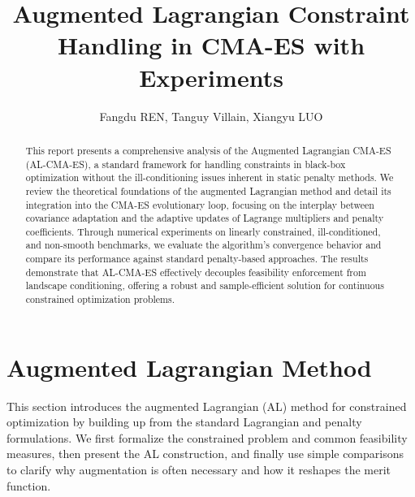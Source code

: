 \documentclass[11pt,a4paper]{article}
\title{Augmented Lagrangian Constraint Handling in CMA-ES with Experiments}
\author{Fangdu REN, Tanguy Villain, Xiangyu LUO}
\date{}
\numberwithin{equation}{section}
\numberwithin{figure}{section}
\numberwithin{table}{section}
\theoremstyle{definition}
\begin{document}
\maketitle

\begin{abstract}
This report presents a comprehensive analysis of the Augmented Lagrangian CMA-ES (AL-CMA-ES), a standard framework for handling constraints in black-box optimization without the ill-conditioning issues inherent in static penalty methods. We review the theoretical foundations of the augmented Lagrangian method and detail its integration into the CMA-ES evolutionary loop, focusing on the interplay between covariance adaptation and the adaptive updates of Lagrange multipliers and penalty coefficients. Through numerical experiments on linearly constrained, ill-conditioned, and non-smooth benchmarks, we evaluate the algorithm's convergence behavior and compare its performance against standard penalty-based approaches. The results demonstrate that AL-CMA-ES effectively decouples feasibility enforcement from landscape conditioning, offering a robust and sample-efficient solution for continuous constrained optimization problems.
\end{abstract}

\tableofcontents
\newpage



\section{Augmented Lagrangian Method}\label{sec:al}
This section introduces the augmented Lagrangian (AL) method for constrained optimization by building up from the standard Lagrangian and penalty formulations. We first formalize the constrained problem and common feasibility measures, then present the AL construction, and finally use simple comparisons to clarify why augmentation is often necessary and how it reshapes the merit function.
\end{document}
